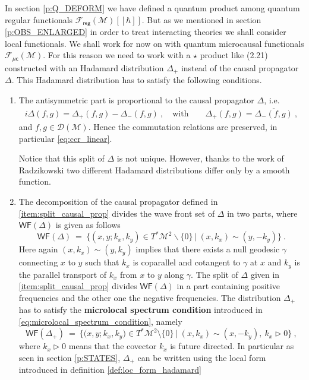 \documentclass[11pt]{book}
\newcommand{\WF}{\mathsf{WF}}
\newcommand{\reg}{\mathsf{reg}}
\newcommand{\Dcal}{\mathcal{D}}
\newcommand{\Fcal}{\mathcal{F}}
\newcommand{\Mcal}{\mathcal{M}}
\theoremstyle{break}
\begin{document}
In section \ref{p:Q_DEFORM} we have defined a quantum product among quantum regular functionals $\Fcal_\reg(\Mcal)[[\hbar]]$. But as we mentioned in section \ref{p:OBS_ENLARGED} in order to treat interacting theories we shall consider local functionals. We shall work for now on with quantum microcausal functionals $\Fcal_{\mathsf{\mu c}}(\Mcal)$. For this reason we need to work with a $\star$ product like (2.21) constructed with  an Hadamard distribution $\Delta_+$ instead of the causal propagator $\Delta$. This Hadamard distribution has to satisfy the following conditions.
%
\begin{enumerate}
\item\label{item:split_causal_prop} The antisymmetric part is proportional to the causal propagator $\Delta$, i.e. 
%
\begin{eqnarray*}
i \Delta(f,g) = \Delta_+(f,g) - \Delta_-(f,g) \ , \quad \mbox{with} \qquad \Delta_+(f,g) = \overline{\Delta_-(f,g)} \ ,
\end{eqnarray*}
%
and $f,g \in \Dcal(\Mcal)$. Hence the commutation relations are preserved, in particular \eqref{eq:ccr_linear}.\par%
%
Notice that this split of $\Delta$ is not unique. However, thanks to the work of Radzikowski \cite{RADZIKOWSKI_1996} two different Hadamard distributions differ only by a smooth function. 

\item The decomposition of the causal propagator defined in \ref{item:split_causal_prop} divides the wave front set of $\Delta$ in two parts, where $\WF(\Delta)$ is given as follows
%
\begin{equation}
\WF(\Delta) \ = \ \bigg\{ \left(x,y;k_x,k_y\right) \in T^{\ast}\Mcal^{2} \backslash\{0\} \ \bigg| \ (x,k_x) \sim (y,-k_y) \bigg\} \ .
\label{eq:wf_causal_prop}
\end{equation}
%
Here again $(x,k_x) \sim (y,k_y)$ implies that there exists a null geodesic $\gamma$ connecting $x$ to $y$ such that $k_x$ is coparallel and cotangent to $\gamma$ at $x$ and $k_y$ is the parallel transport of $k_x$ from $x$ to $y$ along $\gamma$. The split of $\Delta$ given in \ref{item:split_causal_prop} divides $\WF(\Delta)$ in a part containing positive frequencies and the other one the negative frequencies. The distribution $\Delta_+$ has to satisfy the \textbf{microlocal spectrum condition} introduced in \eqref{eq:microlocal_spectrum_condition}, namely
%
\begin{equation}
\WF(\Delta_+) \ = \ \bigg\{ \bigg( x, y ; k_x, k_y \bigg) \in T^\ast\Mcal^2 \setminus \{0\} \ \bigg| \ (x,k_x) \sim (x,-k_y), \ k_x \triangleright 0 \bigg\} \ ,
\label{eq:wf_hadamard}
\end{equation}
%
where $k_x \triangleright 0$ means that the covector $k_x$ is future directed. In particular as seen in section \ref{p:STATES}, $\Delta_+$ can be written using the local form introduced in definition \ref{def:loc_form_hadamard}
\end{enumerate}
\end{document}
